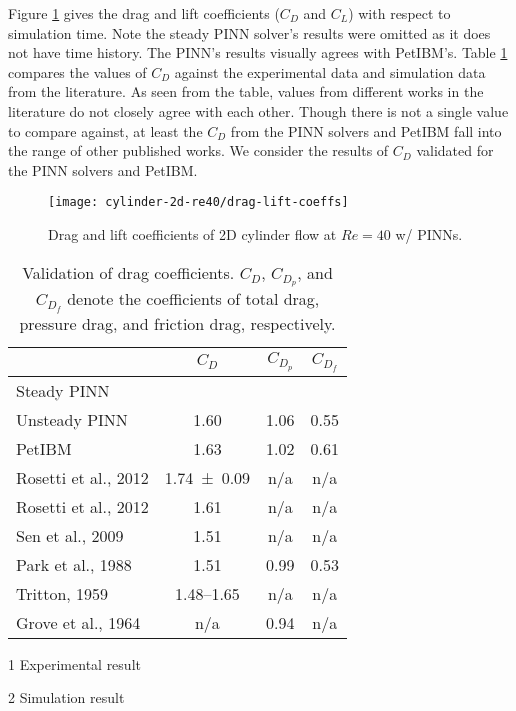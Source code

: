 Figure \ref{fig:cylinder-re40-drag-lift} gives the drag and lift coefficients ($C_D$ and $C_L$) with respect to simulation time.
Note the steady PINN solver's results were omitted as it does not have time history.
The PINN's results visually agrees with PetIBM's.
Table \ref{table:cylinder-re40-cd-comparison} compares the values of $C_D$ against the experimental data and simulation data from the literature.
As seen from the table, values from different works in the literature do not closely agree with each other.
Though there is not a single value to compare against, at least the $C_D$ from the PINN solvers and PetIBM fall into the range of other published works.
We consider the results of $C_D$ validated for the PINN solvers and PetIBM.

\begin{figure}
    \centering%
    \texttt{[image: cylinder-2d-re40/drag-lift-coeffs]}%
    \caption{%
        Drag and lift coefficients of 2D cylinder flow at $Re=\num{40}$ w/ PINNs.
    }
    \label{fig:cylinder-re40-drag-lift}%
\end{figure}

\begin{table}
    \centering%
    \begin{threeparttable}[b]
        \begin{tabular}{lccc}
            \toprule
            & $C_D$ & $C_{D_p}$ & $C_{D_f}$ \\
            \midrule
            Steady PINN &  &  &  \\
            Unsteady PINN & 1.60 & 1.06 & 0.55 \\
            PetIBM & 1.63 & 1.02 & 0.61 \\
            Rosetti et al., 2012\cite{rosetti_urans_2012}\tnote{1} & \num{1.74+-0.09} & n/a & n/a \\
            Rosetti et al., 2012\cite{rosetti_urans_2012}\tnote{2} & 1.61 & n/a & n/a \\
            Sen et al., 2009\cite{sen_steady_2009}\tnote{2} & 1.51 & n/a & n/a \\
            Park et al., 1988\cite{park_numerical_1998}\tnote{2} & 1.51 & 0.99 & 0.53 \\
            Tritton, 1959\cite{tritton_experiments_1959}\tnote{1} & 1.48--1.65 & n/a & n/a \\
            Grove et al., 1964\cite{grove_experimental_1964}\tnote{1} & n/a & 0.94 & n/a \\
            \bottomrule
        \end{tabular}%
        \begin{tablenotes}
            \footnotesize
            \item [1] Experimental result
            \item [2] Simulation result
        \end{tablenotes}
        \caption{%
            Validation of drag coefficients. %
            $C_D$, $C_{D_p}$, and $C_{D_f}$ denote the coefficients of total drag, pressure drag, %
            and friction drag, respectively.%
        }%
        \label{table:cylinder-re40-cd-comparison}
    \end{threeparttable}
\end{table}%


